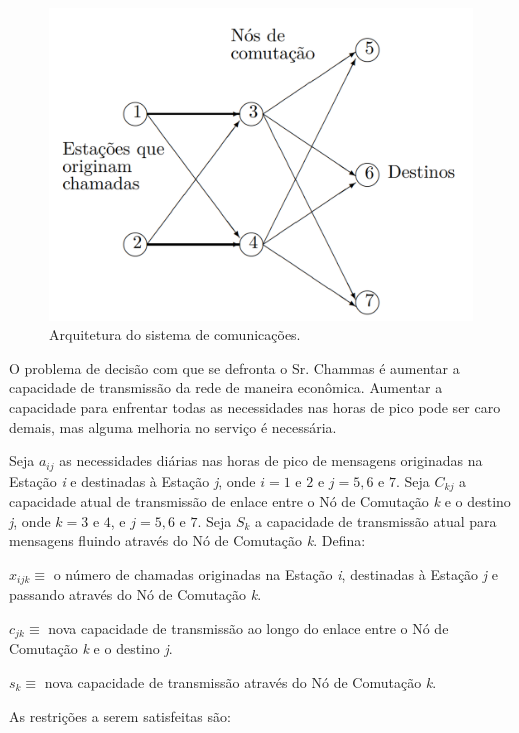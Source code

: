 \documentclass{article}
\begin{document}
    \begin{figure}[H]
            \centering
            \includegraphics[scale=0.35]{figura.png}
            \caption{Arquitetura do sistema de comunicações.}
            \label{arq}
        \end{figure}
    
    O problema de decisão com que se defronta o Sr. Chammas é aumentar a capacidade de transmissão da rede de maneira econômica. Aumentar a capacidade para enfrentar todas as necessidades nas horas de pico pode ser caro demais, mas alguma melhoria no serviço é necessária.
    
    Seja \(a_{ij}\) as necessidades diárias nas horas de pico de mensagens originadas na Estação \textit{i} e destinadas à Estação \textit{j}, onde \(i = 1\) e \(2\) e \(j = 5, 6\) e \(7\). Seja \(C_{kj}\) a capacidade atual de transmissão de enlace entre o Nó de Comutação \textit{k} e o destino \textit{j}, onde \(k = 3\) e \(4\), e \(j = 5, 6\) e \(7\). Seja \(S_{k}\) a capacidade de transmissão atual para mensagens fluindo através do Nó de Comutação \textit{k}. Defina:
    
   \(x_{ijk} \equiv\) o número de chamadas originadas na Estação \textit{i},
destinadas à Estação \textit{j} e passando através do Nó de Comutação \textit{k}.

\(c_{jk} \equiv\) nova capacidade de transmissão ao longo do enlace entre o Nó de Comutação \textit{k} e o destino \textit{j}.

\(s_{k} \equiv\) nova capacidade de transmissão através do Nó de Comutação \textit{k}.

As restrições a serem satisfeitas são:
\end{document}
